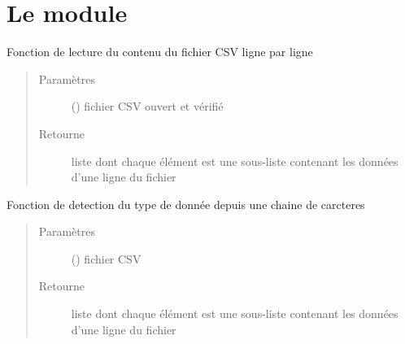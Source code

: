 \documentclass[letterpaper,10pt,openany,oneside,french]{sphinxmanual}
\begin{document}
\section{Le module }
\label{\detokenize{analyseContenuFichier:le-module-analyse-contenu-fichier}}

\begin{fulllineitems}
\label{\detokenize{analyseContenuFichier:chargement_des_donnees.analyseContenuFichier.lecture}}
Fonction de lecture du contenu du fichier CSV ligne par ligne
\begin{quote}\begin{description}
\item[{Paramètres}] \leavevmode
{} () \textendash{} fichier CSV ouvert et vérifié

\item[{Retourne}] \leavevmode
liste dont chaque élément est une sous-liste contenant les données d’une ligne du fichier

\end{description}\end{quote}

\end{fulllineitems}


\begin{fulllineitems}
\label{\detokenize{analyseContenuFichier:chargement_des_donnees.analyseContenuFichier.typeDeDonnee}}
Fonction de detection du type de donnée depuis une chaine de carcteres
\begin{quote}\begin{description}
\item[{Paramètres}] \leavevmode
{} () \textendash{} fichier CSV

\item[{Retourne}] \leavevmode
liste dont chaque élément est une sous-liste contenant les données d’une ligne du fichier

\end{description}\end{quote}

\end{fulllineitems}
\end{document}
